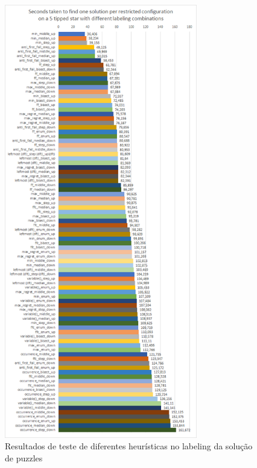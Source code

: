 \begin{figure}[ht]
\centering
\includegraphics[width=0.75\textwidth]{figuras/graphs/solver_heuristics_analysis.png}
\caption{Resultados de teste de diferentes heurísticas no labeling da solução de puzzles}
\label{gph:solver_heuristics_analysis}
\end{figure}